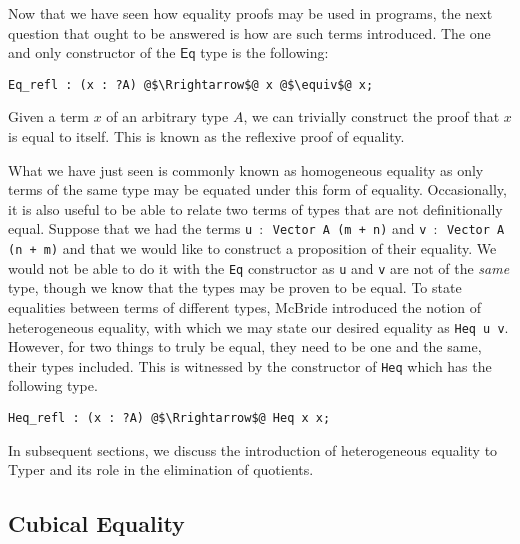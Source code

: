 \documentclass[12pt,twoside,maitrise]{dms}
\theoremstyle{definition}
\numberwithin{equation}{section}
\numberwithin{table}{chapter}
\numberwithin{figure}{chapter}
\newcommand\kw[1] {\textsf{#1}}
\newcommand\id[1] {\texttt{#1}}
\newcommand\fn[1] {\texttt{#1}}
\begin{document}
Now that we have seen how equality proofs may be used in programs, the next
question that ought to be answered is how are such terms introduced. The one and
only constructor of the $\kw{Eq}$ type is the following:

\begin{verbatim}
Eq_refl : (x : ?A) @$\Rrightarrow$@ x @$\equiv$@ x;
\end{verbatim}

Given a term $x$ of an arbitrary type $A$, we can trivially construct the proof
that $x$ is equal to itself. This is known as the reflexive proof of equality.

What we have just seen is commonly known as homogeneous equality as only terms
of the same type may be equated under this form of equality. Occasionally, it is
also useful to be able to relate two terms of types that are not definitionally
equal. Suppose that we had the terms \fn{u $\colon$ Vector A (m + n)} and \fn{v $\colon$ Vector A
  (n + m)} and that we would like to construct a proposition of their equality.
We would not be able to do it with the \fn{Eq} constructor as \id{u} and \id{v}
are not of the \emph{same} type, though we know that the types may be proven to
be equal. To state equalities between terms of different types, McBride
introduced the notion of heterogeneous equality\cite{mcbride2000dependently},
with which we may state our desired equality as \fn{Heq u v}. However, for two
things to truly be equal, they need to be one and the same, their types
included. This is witnessed by the constructor of \fn{Heq} which has the
following type.

\begin{verbatim}
Heq_refl : (x : ?A) @$\Rrightarrow$@ Heq x x;
\end{verbatim}

In subsequent sections, we discuss the introduction of heterogeneous equality to
Typer and its role in the elimination of quotients.


\subsection*{Cubical Equality}
\end{document}
